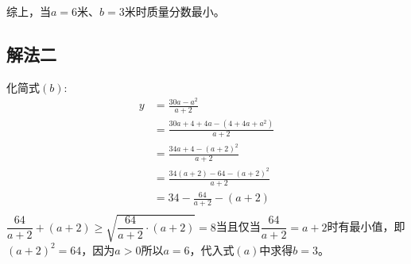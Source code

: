 \documentclass[answers]{exam}
\begin{document}
\begin{questions}
\begin{solution}
		综上，当$a=6$米、$b=3$米时质量分数最小。

		\subsection*{解法二}
		化简式$(b)$:
		\begin{align*}
			y & = \frac{30a -a^2}{a+2}                      \\
			  & = \frac{30a + 4 + 4a - (4 + 4a + a^2)}{a+2} \\
			  & = \frac{34a + 4 - (a+2)^2}{a+2}             \\
			  & = \frac{34(a+2) -64 - (a+2)^2}{a+2}         \\
			  & = 34 - \frac{64}{a+2} - (a+2)               \\
		\end{align*}
		$\dfrac{64}{a+2} + (a+2) \geqslant \sqrt{\dfrac{64}{a+2}\cdot(a+2)} = 8$当且仅当$\dfrac{64}{a+2} =
		a+2$时有最小值，即$(a+2)^2 = 64$，因为$a>0$所以$a=6$，代入式$(a)$中求得$b=3$。
	\end{solution}
\end{questions}
\end{document}
